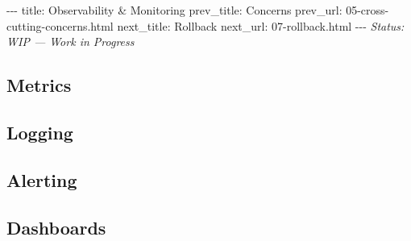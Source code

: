 \documentclass[12pt,a4paper]{article}
\begin{document}
-\/-\/- title: Observability \& Monitoring prev\_title: Concerns
prev\_url: 05-cross-cutting-concerns.html next\_title: Rollback
next\_url: 07-rollback.html -\/-\/- \emph{Status: WIP --- Work in
Progress}

\subsection{Metrics}\label{metrics}

\subsection{Logging}\label{logging}

\subsection{Alerting}\label{alerting}

\subsection{Dashboards}\label{dashboards}
\end{document}
